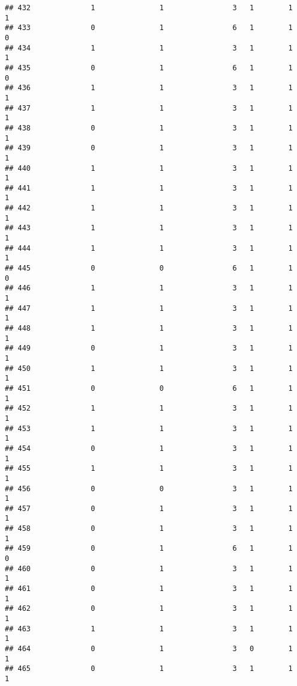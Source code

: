 \documentclass[]{article}
\begin{document}
\begin{verbatim}
## 432              1               1                3   1        1        1
## 433              0               1                6   1        1        0
## 434              1               1                3   1        1        1
## 435              0               1                6   1        1        0
## 436              1               1                3   1        1        1
## 437              1               1                3   1        1        1
## 438              0               1                3   1        1        1
## 439              0               1                3   1        1        1
## 440              1               1                3   1        1        1
## 441              1               1                3   1        1        1
## 442              1               1                3   1        1        1
## 443              1               1                3   1        1        1
## 444              1               1                3   1        1        1
## 445              0               0                6   1        1        0
## 446              1               1                3   1        1        1
## 447              1               1                3   1        1        1
## 448              1               1                3   1        1        1
## 449              0               1                3   1        1        1
## 450              1               1                3   1        1        1
## 451              0               0                6   1        1        1
## 452              1               1                3   1        1        1
## 453              1               1                3   1        1        1
## 454              0               1                3   1        1        1
## 455              1               1                3   1        1        1
## 456              0               0                3   1        1        1
## 457              0               1                3   1        1        1
## 458              0               1                3   1        1        1
## 459              0               1                6   1        1        0
## 460              0               1                3   1        1        1
## 461              0               1                3   1        1        1
## 462              0               1                3   1        1        1
## 463              1               1                3   1        1        1
## 464              0               1                3   0        1        1
## 465              0               1                3   1        1        1

\end{verbatim}
\end{document}
